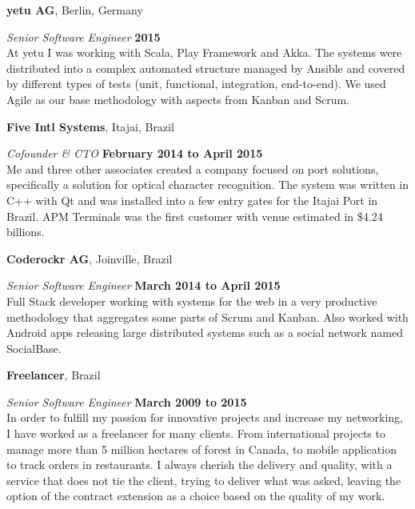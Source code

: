 \documentclass[12pt]{article}
\newcommand{\halfblankline}{\quad\vspace{-0.5\baselineskip}\pagebreak[3]}
\begin{document}
\halfblankline

\textbf{yetu AG},
Berlin, Germany
\begin{outerlist}

    \item[] \textit{Senior Software Engineer}%
            \hfill \textbf{2015}\\
			At yetu I was working with Scala, Play Framework and Akka. The systems were distributed into a complex automated structure managed by Ansible and covered by different types of tests (unit, functional, integration, end-to-end). We used Agile as our base methodology with aspects from Kanban and Scrum.

\end{outerlist}

\halfblankline

\textbf{Five Intl Systems},
Itajai, Brazil
\begin{outerlist}

    \item[] \textit{Cofounder \& CTO}%
            \hfill \textbf{February 2014 to April 2015}\\
			Me and three other associates created a company focused on port solutions, specifically a solution for optical character recognition. The system was written in C++ with Qt and was installed into a few entry gates for the Itajai Port in Brazil. APM Terminals was the first customer with venue estimated in \$4.24 billions.
			
\end{outerlist}

\halfblankline

\textbf{Coderockr AG},
Joinville, Brazil
\begin{outerlist}

    \item[] \textit{Senior Software Engineer}%
            \hfill \textbf{March 2014 to April 2015}\\
			Full Stack developer working with systems for the web in a very productive methodology that aggregates some parts of Scrum and Kanban. Also worked with Android apps releasing large distributed systems such as a social network named SocialBase.
			
\end{outerlist}

\halfblankline

\textbf{Freelancer},
Brazil
\begin{outerlist}

    \item[] \textit{Senior Software Engineer}%
            \hfill \textbf{March 2009 to 2015}\\
			In order to fulfill my passion for innovative projects and increase my networking, I have worked as a freelancer for many clients. From international projects to manage more than 5 million hectares of forest in Canada, to mobile application to track orders in restaurants. I always cherish the delivery and quality, with a service that does not tie the client, trying to deliver what was asked, leaving the option of the contract extension as a choice based on the quality of my work.
			
\end{outerlist}
\end{document}
